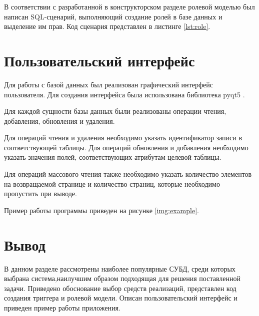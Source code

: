В соответствии с разработанной в конструкторском разделе ролевой моделью был написан SQL-сценарий, выполняющий создание ролей в базе данных и выделение им прав. Код сценария представлен в листинге \ref{lst:role}.


%
%

\section{Пользовательский интерфейс}

Для работы с базой данных был реализован графический интерфейс пользователя. Для создания интерфейса была использована библиотека pyqt5 \cite{pyqt5}.

Для каждой сущности базы данных были реализованы операции чтения, добавления, обновления и удаления.

Для операций чтения и удаления необходимо указать идентификатор записи в соответствующей таблицы. Для операций обновления и добавления необходимо указать значения полей, соответствующих атрибутам целевой таблицы.

\pagebreak 

Для операций массового чтения также необходимо указать количество элементов на возвращаемой странице и количество страниц, которые необходимо пропустить при выводе.

Пример работы программы приведен на рисунке \ref{img:example}.


\section*{Вывод}
В данном разделе рассмотрены наиболее популярные СУБД, среди которых выбрана система,наилучшим образом подходящая для решения поставленной задачи. Приведено обоснование выбор средств реализаций, представлен код создания триггера и ролевой модели. Описан пользовательский интерфейс и приведен пример работы приложения.